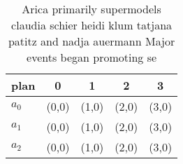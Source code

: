 \documentclass[a4paper]{article}
\begin{document}
\begin{table}
\begin{adjustbox}{width=0.8\columnwidth}
\begin{tabular}{|l|l|l|l|l|}
\hline
\textbf{plan} & \multicolumn{1}{c|}{\textbf{0}} & \multicolumn{1}{c|}{\textbf{1}} & \multicolumn{1}{c|}{\textbf{2}} & \multicolumn{1}{c|}{\textbf{3}} \\ \hline
\textbf{$a_0$}  & (0,0) & (1,0) & (2,0) & (3,0) \\ \hline
\textbf{$a_1$}  & (0,0) & (1,0) & (2,0) & (3,0) \\ \hline
\textbf{$a_2$}  & (0,0) & (1,0) & (2,0) & (3,0) \\ \hline
\end{tabular}
\end{adjustbox}
\caption{Arica primarily supermodels claudia schier heidi klum tatjana patitz and nadja auermann Major events began promoting se
}
\end{table}
\end{document}

